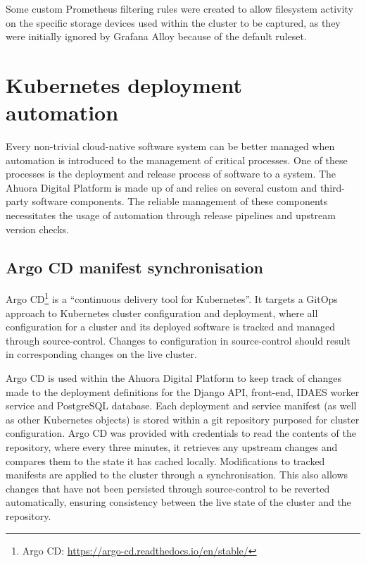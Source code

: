Some custom Prometheus filtering rules were created to allow filesystem activity on the specific storage devices used within the cluster to be captured, as they were initially ignored by Grafana Alloy because of the default ruleset.


\section{Kubernetes deployment automation}

Every non-trivial cloud-native software system can be better managed when automation is introduced to the management of critical processes. One of these processes is the deployment and release process of software to a system. The Ahuora Digital Platform is made up of and relies on several custom and third-party software components. The reliable management of these components necessitates the usage of automation through release pipelines and upstream version checks.

\subsection{Argo CD manifest synchronisation}

Argo CD\footnote{Argo CD: \url{https://argo-cd.readthedocs.io/en/stable/}} is a ``continuous delivery tool for Kubernetes''. It targets a GitOps approach to Kubernetes cluster configuration and deployment, where all configuration for a cluster and its deployed software is tracked and managed through source-control. Changes to configuration in source-control should result in corresponding changes on the live cluster.

Argo CD is used within the Ahuora Digital Platform to keep track of changes made to the deployment definitions for the Django API, front-end, IDAES worker service and PostgreSQL database. Each deployment and service manifest (as well as other Kubernetes objects) is stored within a git repository purposed for cluster configuration. Argo CD was provided with credentials to read the contents of the repository, where every three minutes, it retrieves any upstream changes and compares them to the state it has cached locally. Modifications to tracked manifests are applied to the cluster through a synchronisation. This also allows changes that have not been persisted through source-control to be reverted automatically, ensuring consistency between the live state of the cluster and the repository.

